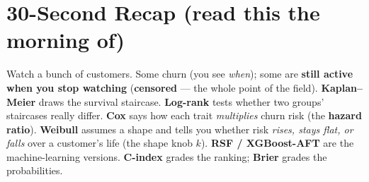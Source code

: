 \documentclass[11pt]{article}
\begin{document}
\section{30-Second Recap (read this the morning of)}
\begin{plainbox}
Watch a bunch of customers. Some churn (you see \emph{when}); some are \textbf{still active when you
stop watching} (\textbf{censored} --- the whole point of the field). \textbf{Kaplan--Meier} draws the
survival staircase. \textbf{Log-rank} tests whether two groups' staircases really differ.
\textbf{Cox} says how each trait \emph{multiplies} churn risk (the \textbf{hazard ratio}).
\textbf{Weibull} assumes a shape and tells you whether risk \emph{rises, stays flat, or falls} over a
customer's life (the shape knob $k$). \textbf{RSF / XGBoost-AFT} are the machine-learning versions.
\textbf{C-index} grades the ranking; \textbf{Brier} grades the probabilities.
\end{plainbox}

\end{document}

